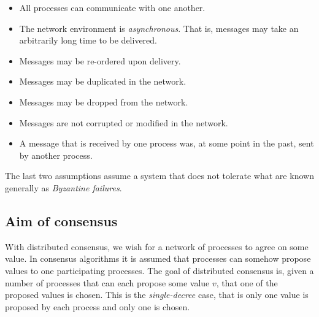 

\begin{itemize}
  \item All processes can communicate with one another.
  \item The network environment is \emph{asynchronous}. That is, messages may take an arbitrarily long time to be delivered.
  \item Messages may be re-ordered upon delivery.
  \item Messages may be duplicated in the network.
  \item Messages may be dropped from the network.
  \item Messages are not corrupted or modified in the network.
  \item A message that is received by one process was, at some point in the past, sent by another process.
\end{itemize}


The last two assumptions assume a system that does not tolerate what are known generally as \emph{Byzantine failures}.




\subsection{Aim of consensus}

With distributed consensus, we wish for a network of processes to agree on some value. In consensus algorithms it is assumed that processes can somehow propose values to one participating processes. The goal of distributed consensus is, given a number of processes that can each propose some value $v$, that one of the proposed values is chosen. This is the \emph{single-decree} case, that is only one value is proposed by each process and only one is chosen. \\

